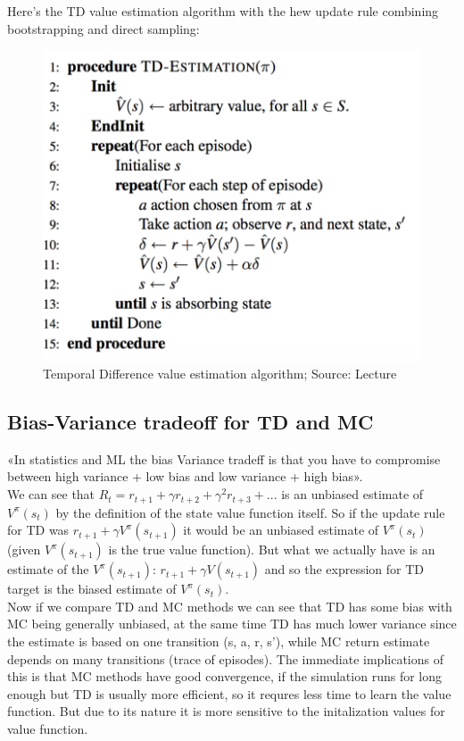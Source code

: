 Here's the TD value estimation algorithm with the hew update rule combining bootstrapping and direct sampling:

\begin{figure}[h!]
  \centering
  \includegraphics[scale=0.5]{figures/TD_value_estimation.PNG}
  \caption{Temporal Difference value estimation algorithm; Source: Lecture}
  \label{fig:td}
\end{figure}

\subsection{Bias-Variance tradeoff for TD and MC}
«In statistics and ML the bias Variance tradeff is that you have to compromise between high variance + low bias and low variance + high bias». \\

We can see that $R_t = r_{t+1} + \gamma r_{t+2} + \gamma ^2 r_{t+3} + ...$ is an unbiased estimate of $V^{\pi} (s_t)$ by the definition of the state value function itself. So if the update rule for TD was $r_{t+1} + \gamma V^{\pi}(s_{t+1})$ it would be an unbiased estimate of $V^{\pi}(s_{t})$ (given $V^{\pi}(s_{t+1})$ is the true value function). But what we actually have is an estimate of the $V^{\pi}(s_{t+1})$: $r_{t+1} + \gamma V(s_{t+1})$ and so the expression for TD target is the biased estimate of $V^{\pi}(s_t)$. \\

Now if we compare TD and MC methods we can see that TD has some bias with MC being generally unbiased, at the same time TD has much lower variance since the estimate is based on one transition (s, a, r, s'), while MC return estimate depends on many transitions (trace of episodes). The immediate implications of this is that MC methods have good convergence,
if the simulation runs for long enough but TD is usually more efficient, so it requres less time to learn the value function.
But due to its nature it is more sensitive to the initalization values for value function.

